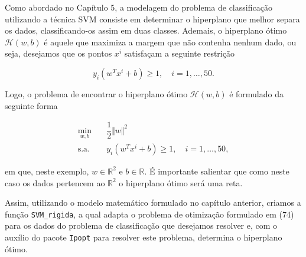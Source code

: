 \documentclass[12pt,a4paper]{scrartcl}
\theoremstyle{definition}%
\begin{document}
    Como abordado no Capítulo 5, a modelagem do problema de classificação
utilizando a técnica SVM consiste em determinar o hiperplano que melhor
separa os dados, classificando-os assim em duas classes. Ademais, o
hiperplano ótimo \(\mathcal{H}(w,b)\) é aquele que maximiza a margem que
não contenha nenhum dado, ou seja, desejamos que os pontos \(x^{i}\)
satisfaçam a seguinte restrição

\[
y_i(w^{T}x^{i}+b) \geq 1, \quad i=1, \ldots , 50.
\]

Logo, o problema de encontrar o hiperplano ótimo \(\mathcal{H}(w,b)\) é
formulado da seguinte forma

\begin{align}
\min_{w,b} & \quad \dfrac{1}{2} \Vert w\Vert^{2} \\
\text{s.a.} &  \quad y_i(w^{T}x^{i}+b) \geq 1, \quad i=1, \ldots , 50, 
\end{align}

em que, neste exemplo, \(w \in \mathbb{R}^{2}\) e \(b\in \mathbb{R}\). É
importante salientar que como neste caso os dados pertencem ao
\(\mathbb{R}^{2}\) o hiperplano ótimo será uma reta.

Assim, utilizando o modelo matemático formulado no capítulo anterior,
criamos a função \texttt{SVM\_rigida}, a qual adapta o problema de
otimização formulado em (74) para os dados do problema de classificação
que desejamos resolver e, com o auxílio do pacote \texttt{Ipopt} para
resolver este problema, determina o hiperplano ótimo.
\end{document}
